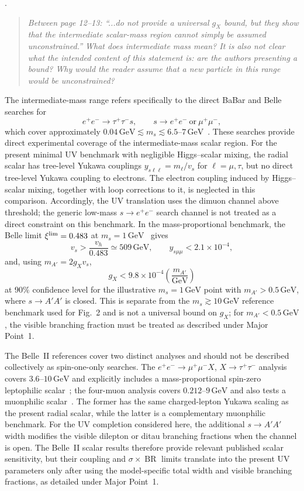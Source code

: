 \documentclass[12pt,a4paper]{article}
\begin{document}
\medskip
{}. \begin{quote}\itshape
Between page 12--13: ``...do not provide a universal \(g_X\) bound, but they show that the intermediate scalar-mass region cannot simply be assumed unconstrained.'' What does intermediate mass mean? It is also not clear what the intended content of this statement is: are the authors presenting a bound? Why would the reader assume that a new particle in this range would be unconstrained?
\end{quote}

The intermediate-mass range refers specifically to the direct BaBar and Belle searches for
\[
e^+e^-\to\tau^+\tau^-s,\qquad
s\to e^+e^-\ \text{or}\ \mu^+\mu^-,
\]
which cover approximately \(0.04\,\mathrm{GeV}\lesssim m_s\lesssim6.5\text{--}7\,\mathrm{GeV}\)~\cite{BaBar:2020jma,Belle:2022gbl}. These searches provide direct experimental coverage of the intermediate-mass scalar region. For the present minimal UV benchmark with negligible Higgs--scalar mixing, the radial scalar has tree-level Yukawa couplings \(y_{s\ell\ell}=m_\ell/v_s\) for \(\ell=\mu,\tau\), but no direct tree-level Yukawa coupling to electrons. The electron coupling induced by Higgs--scalar mixing, together with loop corrections to it, is neglected in this comparison. Accordingly, the UV translation uses the dimuon channel above threshold; the generic low-mass \(s\to e^+e^-\) search channel is not treated as a direct constraint on this benchmark. In the mass-proportional benchmark, the Belle limit \(\xi^{\rm lim}=0.483\) at \(m_s=1\,\mathrm{GeV}\)~\cite{Belle:2022gbl} gives
\[
v_s>\frac{v_h}{0.483}\simeq509\,\mathrm{GeV},
\qquad
y_{s\mu\mu}<2.1\times10^{-4},
\]
and, using \(m_{A'}=2g_Xv_s\),
\[
g_X<9.8\times10^{-4}
\left(\frac{m_{A'}}{\mathrm{GeV}}\right)
\]
at \(90\%\) confidence level for the illustrative \(m_s=1\,\mathrm{GeV}\) point with \(m_{A'}>0.5\,\mathrm{GeV}\), where \(s\to A'A'\) is closed. This is separate from the \(m_s\gtrsim10\,\mathrm{GeV}\) reference benchmark used for Fig.~2 and is not a universal bound on \(g_X\); for \(m_{A'}<0.5\,\mathrm{GeV}\), the visible branching fraction must be treated as described under Major Point~1.

The Belle~II references cover two distinct analyses and should not be described collectively as spin-one-only searches. The \(e^+e^-\to\mu^+\mu^-X\), \(X\to\tau^+\tau^-\) analysis covers \(3.6\text{--}10\,\mathrm{GeV}\) and explicitly includes a mass-proportional spin-zero leptophilic scalar~\cite{Belle-II:2023ydz}; the four-muon analysis covers \(0.212\text{--}9\,\mathrm{GeV}\) and also tests a muonphilic scalar~\cite{Belle-II:2024wtd}. The former has the same charged-lepton Yukawa scaling as the present radial scalar, while the latter is a complementary muonphilic benchmark. For the UV completion considered here, the additional \(s\to A'A'\) width modifies the visible dilepton or ditau branching fractions when the channel is open. The Belle~II scalar results therefore provide relevant published scalar sensitivity, but their coupling and \(\sigma\times\operatorname{BR}\) limits translate into the present UV parameters only after using the model-specific total width and visible branching fractions, as detailed under Major Point~1.
\end{document}
